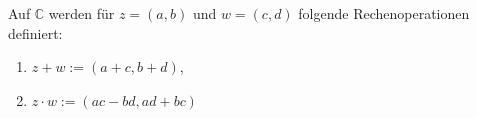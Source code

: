 Auf $\mathbb{C}$ werden für $z = (a, b)$ und $w = (c, d)$ folgende Rechenoperationen definiert:

\begin{enumerate}[label={},leftmargin=*]
    \item {} $z+w := (a+c, b+d)$,
    \item {} $z \cdot w := (ac - bd, ad+bc)$
\end{enumerate}
